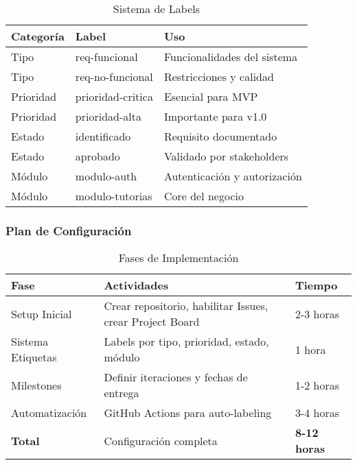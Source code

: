 \documentclass[12pt,a4paper]{article}
\begin{document}
\begin{table}[H]
\centering
\caption{Sistema de Labels}
\begin{tabular}{|p{3cm}|p{3.5cm}|p{7cm}|}
\hline
\rowcolor{headercolor!30}
\textbf{\color{white}Categoría} & \textbf{\color{white}Label} & \textbf{\color{white}Uso} \\
\hline
Tipo & req-funcional & Funcionalidades del sistema \\
\hline
Tipo & req-no-funcional & Restricciones y calidad \\
\hline
Prioridad & prioridad-critica & Esencial para MVP \\
\hline
Prioridad & prioridad-alta & Importante para v1.0 \\
\hline
Estado & identificado & Requisito documentado \\
\hline
Estado & aprobado & Validado por stakeholders \\
\hline
Módulo & modulo-auth & Autenticación y autorización \\
\hline
Módulo & modulo-tutorias & Core del negocio \\
\hline
\end{tabular}
\end{table}

\subsubsection{Plan de Configuración}

\begin{table}[H]
\centering
\caption{Fases de Implementación}
\begin{tabular}{|p{3cm}|p{6cm}|p{4cm}|}
\hline
\rowcolor{headercolor!30}
\textbf{\color{white}Fase} & \textbf{\color{white}Actividades} & \textbf{\color{white}Tiempo} \\
\hline
Setup Inicial & Crear repositorio, habilitar Issues, crear Project Board & 2-3 horas \\
\hline
Sistema Etiquetas & Labels por tipo, prioridad, estado, módulo & 1 hora \\
\hline
Milestones & Definir iteraciones y fechas de entrega & 1-2 horas \\
\hline
Automatización & GitHub Actions para auto-labeling & 3-4 horas \\
\hline
\rowcolor{successgreen!30}
\textbf{Total} & Configuración completa & \textbf{8-12 horas} \\
\hline
\end{tabular}
\end{table}
\end{document}
